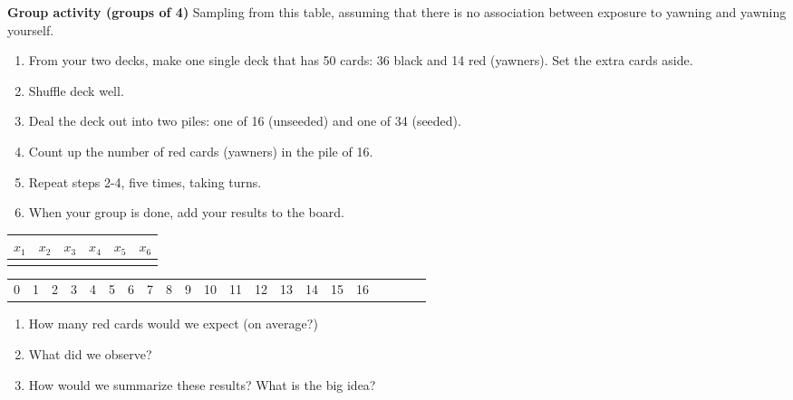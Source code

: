 \documentclass[10pt]{article}
\newcommand{\ans}{\vspace{0.25in}}
\begin{document}
\textbf{Group activity (groups of 4)} Sampling from this table, assuming that there is no association between exposure to yawning and yawning yourself.  
\begin{enumerate}
  \item From your two decks, make one single deck that has 50 cards: 36 black and 14 red (yawners).  Set the extra cards aside.
  \item Shuffle deck well.
  \item Deal the deck out into two piles: one of 16 (unseeded) and one of 34 (seeded).
  \item Count up the number of red cards (yawners) in the pile of 16.
  \item Repeat steps 2-4, five times, taking turns.
  \item When your group is done, add your results to the board.
\end{enumerate}

\begin{center}
\begin{tabular}{|c|c|c|c|c|c|}
  \hline
  $x_1$ & $x_2$ & $x_3$ & $x_4$ & $x_5$ & $x_6$ \\
  \hline
  \hspace{0.75in} & \hspace{0.75in} & \hspace{0.75in} & \hspace{0.75in} & \hspace{0.75in} & \hspace{0.75in} \\[5ex]
  \hline
\end{tabular}
\end{center}

\vspace{2in}

\begin{center}
\begin{tabular}{|c|c|c|c|c|c|c|c|c|c|c|c|c|c|c|c|c|c|c|c|c|}
  \hline
  0 & 1 & 2 & 3 & 4 & 5 & 6 & 7 & 8 & 9 & 10 & 11 & 12 & 13 & 14 & 15 & 16 \\
\end{tabular}
\end{center}

\begin{enumerate}
  \item How many red cards would we expect (on average?)
  \ans
  \item What did we observe?
  \ans
  \item How would we summarize these results?   What is the big idea?
  \ans
\end{enumerate}
\end{document}
